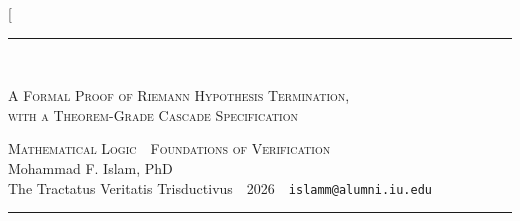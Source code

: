 \documentclass[twocolumn,10pt]{article}
\theoremstyle{plain}
\theoremstyle{definition}
\begin{document}
\twocolumn[{
\begin{center}
{\color{copper}\rule{0.86\textwidth}{0.9pt}}\\[7pt]
{\scshape\LARGE A Formal Proof of Riemann Hypothesis Termination,\\[2pt] with a Theorem-Grade Cascade Specification\par}\vspace{6pt}
{\color{copper}\scshape\small Mathematical Logic \,\textperiodcentered\, Foundations of Verification}\\[6pt]
{\large Mohammad F. Islam, PhD}\\[1pt]
{\small The Tractatus Veritatis Trisductivus \,\textperiodcentered\, 2026 \,\textperiodcentered\, \texttt{islamm@alumni.iu.edu}}\\[7pt]
{\color{copper}\rule{0.86\textwidth}{0.5pt}}
\end{center}
\vspace{4pt}
}
\end{document}
